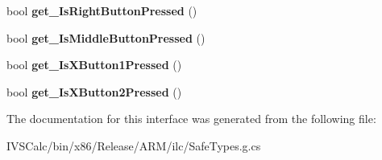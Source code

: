 \begin{DoxyCompactItemize}
bool {\bfseries get\+\_\+\+Is\+Right\+Button\+Pressed} ()
\item 
\mbox{\label{interface_windows_1_1_u_i_1_1_input_1_1_i_pointer_point_properties_a6748f610eb303e4885f2ed14bd3af467}} 
bool {\bfseries get\+\_\+\+Is\+Middle\+Button\+Pressed} ()
\item 
\mbox{\label{interface_windows_1_1_u_i_1_1_input_1_1_i_pointer_point_properties_a77bb8cdfb670e2a5709c5cdfe34130de}} 
bool {\bfseries get\+\_\+\+Is\+X\+Button1\+Pressed} ()
\item 
\mbox{\label{interface_windows_1_1_u_i_1_1_input_1_1_i_pointer_point_properties_aafb4fd9feb6c3b8cddf3c63dce966669}} 
bool {\bfseries get\+\_\+\+Is\+X\+Button2\+Pressed} ()
\end{DoxyCompactItemize}


The documentation for this interface was generated from the following file\+:\begin{DoxyCompactItemize}
\item 
I\+V\+S\+Calc/bin/x86/\+Release/\+A\+R\+M/ilc/Safe\+Types.\+g.\+cs\end{DoxyCompactItemize}
